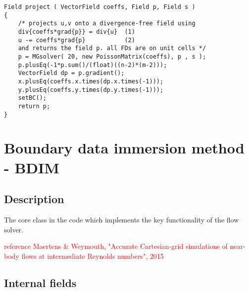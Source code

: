 \documentclass[notitlepage]{article}
\begin{document}
\begin{lstlisting}[style=myCpp]
Field project ( VectorField coeffs, Field p, Field s )
{
	/* projects u,v onto a divergence-free field using
	div{coeffs*grad{p}} = div{u}  (1)
	u -= coeffs*grad{p}           (2)
	and returns the field p. all FDs are on unit cells */
	p = MGsolver( 20, new PoissonMatrix(coeffs), p , s );
	p.plusEq(-1*p.sum()/(float)((n-2)*(m-2)));
	VectorField dp = p.gradient();
	x.plusEq(coeffs.x.times(dp.x.times(-1)));
	y.plusEq(coeffs.y.times(dp.y.times(-1)));
	setBC();
	return p;
}
\end{lstlisting}

\section{Boundary data immersion method - BDIM}

\subsection{Description}

The core class in the code which implements the key functionality of the flow solver.

\textcolor{red}{reference Maertens \& Weymouth, "Accurate Cartesian-grid simulations of near-body flows at intermediate Reynolds numbers", 2015}

\subsection{Internal fields}
\end{document}
